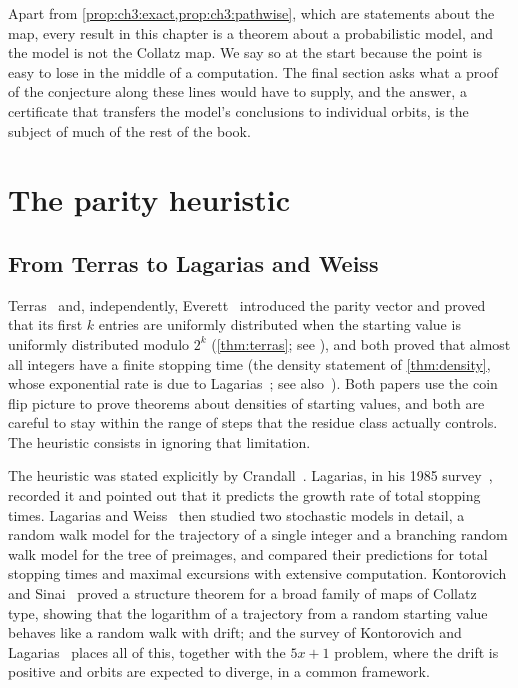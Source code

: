 Apart from \cref{prop:ch3:exact,prop:ch3:pathwise}, which are statements about the map, every result in this chapter is a theorem about a probabilistic model, and the
model is not the Collatz map. We say so at the start because the point is easy
to lose in the middle of a computation. The final section asks what a proof of
the conjecture along these lines would have to supply, and the answer, a
certificate that transfers the model's conclusions to individual orbits, is
the subject of much of the rest of the book.

\section{The parity heuristic}\label{sec:ch3:heuristic}

\subsection{From Terras to Lagarias and Weiss}

Terras~\cite{terras1976} and, independently, Everett~\cite{everett1977}
introduced the parity vector and proved that its first
$k$ entries are uniformly distributed when the starting value is uniformly
distributed modulo $2^k$ (\cref{thm:terras}; see \cite[Theorem~B]{lagarias1985}),
and both proved that almost all integers have a finite stopping time
(the density statement of \cref{thm:density}, whose exponential rate is due to Lagarias~\cite[Theorem~D]{lagarias1985}; see also~\cite{terras1979}). Both papers use the coin flip
picture to prove theorems about densities of starting values, and both are
careful to stay within the range of steps that the residue class actually
controls. The heuristic consists in ignoring that limitation.

The heuristic was stated explicitly by Crandall~\cite{crandall1978}.
Lagarias, in his 1985 survey~\cite[\S2.1]{lagarias1985}, recorded it
and pointed out that it predicts the growth rate of total stopping times.
Lagarias and Weiss~\cite{lagarias1992} then studied two stochastic models in
detail, a random walk model for the trajectory of a single integer and a
branching random walk model for the tree of preimages, and compared their
predictions for total stopping times and maximal excursions with extensive
computation. Kontorovich and Sinai~\cite{kontorovich2002} proved a structure
theorem for a broad family of maps of Collatz type, showing that the
logarithm of a trajectory from a random starting value behaves like a random
walk with drift; and the survey of Kontorovich and
Lagarias~\cite{kontorovich2009} places all of this, together with the $5x+1$
problem, where the drift is positive and orbits are expected to diverge, in a
common framework.


